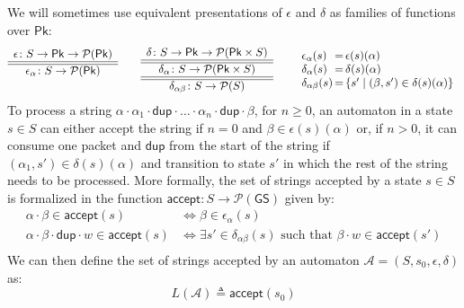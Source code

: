 \documentclass[acmsmall,dvipsnames,nonacm]{acmart}
\newcommand\Pk{\mathsf{Pk}}
\newcommand\pk{\alpha}
\newcommand\pkp{\beta}
\newcommand\dup{\mathsf{dup}}
\newcommand\GS{\mathsf{GS}}
\newcommand\accept{\mathsf{accept}}
\newcommand\pow[1]{\mathcal{P}(#1)}
\begin{document}
We will sometimes use equivalent presentations of $\epsilon$ and $\delta$ as families of functions over $\Pk$:
\[
\begin{array}{c}
\epsilon\colon S \to \Pk \to \mathcal{P}(\Pk) \\
\hline\hline
 \epsilon_\pk \colon S \to \mathcal{P}(\Pk)\\\\
\end{array}\qquad
\begin{array}{c}
\delta\colon S \to \Pk \to \mathcal{P}(\Pk \times S) \\
\hline\hline
\delta_\pk \colon S \to \mathcal{P}(\Pk \times S)\\
\hline\hline
\delta_{\pk\pkp} \colon S \to \mathcal{P}(S)\\
\end{array}
\qquad
\begin{array}{l@{\,}c@{\,}l}
  \epsilon_\pk (s) &=&   \epsilon(s)(\pk)\\
\delta_\pk (s) &=& \delta(s)(\pk)\\
\delta_{\pk\pkp}(s) &=& \{s' \mid (\pkp,s')\in \delta (s)(\pk) \}
\end{array}
 \]
To process a string $\pk \cdot \pk_1 \cdot \dup \cdot \ldots \cdot \pk_n \cdot \dup \cdot \pkp$, for $n\geq 0$, an automaton in a state $s\in S$ can either accept the string if $n=0$ and $\pkp \in \epsilon(s)(\pk)$ or, if $n>0$,  it can consume one packet and $\dup$ from the start of the string if $(\pk_1,s')\in\delta(s)(\pk)$ and transition to state $s'$ in which the rest of the string needs to be processed. More formally, the set of strings accepted by a state $s\in S$ is formalized in the function 
    $\accept\colon S \to \pow\GS $ given by:
    \begin{align*}
     \pk \cdot \pkp \in   \accept(s) &\iff \pkp \in \epsilon_\pk(s) \\
     \pk \cdot \pkp \cdot \dup \cdot w \in   \accept(s) &\iff \exists s' \in \delta_{\pk\pkp}(s) \text{ such that } 
            \pkp \cdot w \in \accept(s') \\
    \end{align*}
   We can then define the set of strings accepted by an automaton $\mathcal A= (S, s_0, \epsilon, \delta)$ as:
\[L(\mathcal{A}) \triangleq \accept(s_0) \]
\end{document}
